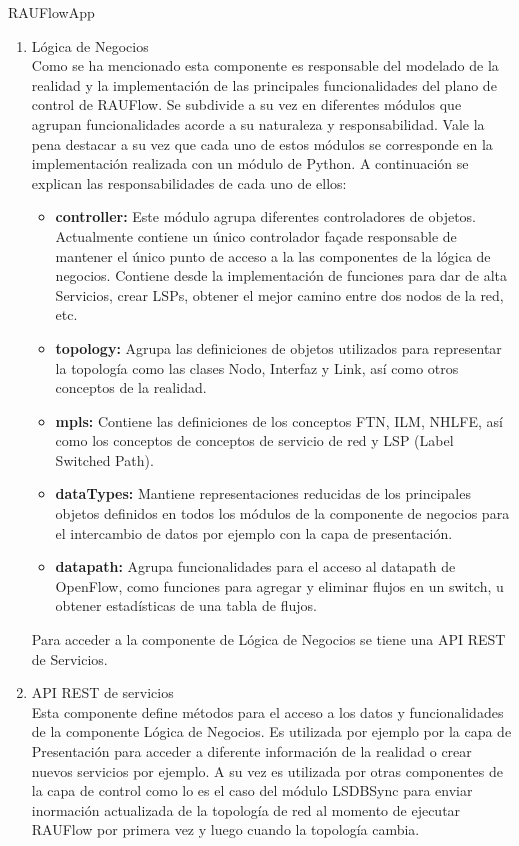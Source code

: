 \begin{subsubsection}{RAUFlowApp}
\begin{enumerate}
\item Lógica de Negocios\\
Como se ha mencionado esta componente es responsable del modelado de la realidad y la implementaci\'on de las principales funcionalidades del plano de control de RAUFlow. Se subdivide a su vez en diferentes m\'odulos que agrupan funcionalidades acorde a su naturaleza y responsabilidad. Vale la pena destacar a su vez que cada uno de estos m\'odulos se corresponde en la implementaci\'on realizada con un m\'odulo de Python. A continuaci\'on se explican las responsabilidades de cada uno de ellos:

\begin{itemize}
\item \textbf{controller:} Este m\'odulo agrupa diferentes controladores de objetos. Actualmente contiene un \'unico controlador façade responsable de mantener el \'unico punto de acceso a la las componentes de la l\'ogica de negocios. Contiene desde la implementaci\'on de funciones para dar de alta Servicios, crear LSPs, obtener el mejor camino entre dos nodos de la red, etc.

\item \textbf{topology:} Agrupa las definiciones de objetos utilizados para representar la topolog\'ia como las clases Nodo, Interfaz y Link, así como otros conceptos de la realidad.
 
\item \textbf{mpls:} Contiene las definiciones de los conceptos FTN, ILM, NHLFE, as\'i como los conceptos de conceptos de servicio de red y LSP (Label Switched Path).

\item \textbf{dataTypes:} Mantiene representaciones reducidas de los principales objetos definidos en todos los m\'odulos de la componente de negocios para el intercambio de datos por ejemplo con la capa de presentaci\'on. 

\item \textbf{datapath:} Agrupa funcionalidades para el acceso al datapath de OpenFlow, como funciones para agregar y eliminar flujos en un switch, u obtener estad\'isticas de una tabla de flujos.
\end{itemize} 

Para acceder a la componente de Lógica de Negocios se tiene una API REST de Servicios.

\item API REST de servicios\\
Esta componente define m\'etodos para el acceso a los datos y funcionalidades de la componente Lógica de Negocios. Es utilizada por ejemplo por la capa de Presentaci\'on para acceder a diferente informaci\'on de la realidad o crear nuevos servicios por ejemplo. A su vez es utilizada por otras componentes de la capa de control como lo es el caso del m\'odulo LSDBSync para enviar inormaci\'on actualizada de la topolog\'ia de red al momento de ejecutar RAUFlow por primera vez y luego cuando la topolog\'ia cambia. 


\end{enumerate}
\end{subsubsection}
